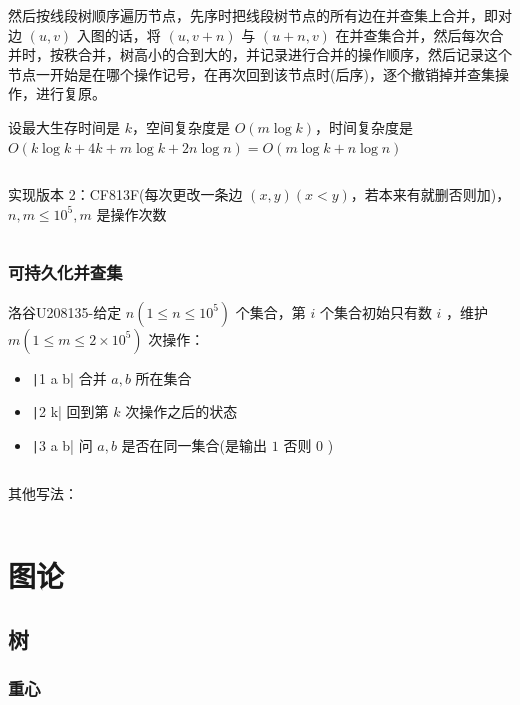 \documentclass[twocolumn,10pt]{ctexart}
\begin{document}
然后按线段树顺序遍历节点，先序时把线段树节点的所有边在并查集上合并，即对边 $(u,v)$ 入图的话，将 $(u,v+n)$ 与 $(u+n,v)$ 在并查集合并，然后每次合并时，按秩合并，树高小的合到大的，并记录进行合并的操作顺序，然后记录这个节点一开始是在哪个操作记号，在再次回到该节点时(后序)，逐个撤销掉并查集操作，进行复原。

设最大生存时间是 $k$，空间复杂度是 $O(m\log k)$，时间复杂度是 $O(k\log k+4k+m\log k+2n\log n)=O(m\log k+n\log n)$

\inputminted{cpp}{code/p5787_segtree_partition.cpp}

\begin{notebox}
实现版本 2：CF813F(每次更改一条边 $(x,y)(x < y)$，若本来有就删否则加)，$n,m\le 10^5,m$ 是操作次数
\end{notebox}

\inputminted{cpp}{code/cf813f_segtree_partition.cpp}

\subsubsection{可持久化并查集}

\begin{notebox}
洛谷U208135-给定 $n(1\le n\le10^5)$ 个集合，第 $i$ 个集合初始只有数 $i$ ，维护 $m(1\le m\le2\times10^5)$ 次操作：

\begin{itemize}
\item \texttt|1 a b| 合并 $a,b$ 所在集合
\item \texttt|2 k| 回到第 $k$ 次操作之后的状态
\item \texttt|3 a b| 问 $a,b$ 是否在同一集合(是输出 $1$ 否则 $0$ )
\end{itemize}
\end{notebox}

\inputminted{cpp}{code/U208135_presistent_dsu.cpp}

其他写法：

\inputminted{cpp}{code/U208135_presistent_dsu2.cpp}

\section{图论}

\subsection{树}

\subsubsection{重心}
\end{document}
